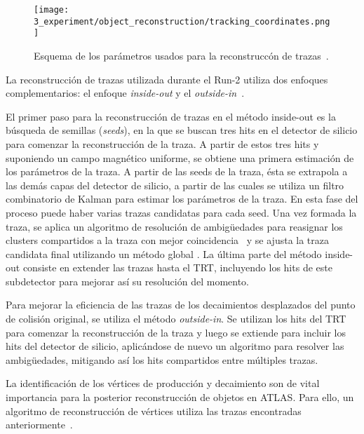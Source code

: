 \begin{figure}[ht!]
    \centering
    \texttt{[image: 3\_experiment/object\_reconstruction/tracking\_coordinates.png]}
    \caption{Esquema de los par\'ametros usados para la reconstrucc\'on de trazas~\cite{ATLAS-Tracking-2007}.}
    \label{fig:objects:track_vtx:track_parameters}
\end{figure}

La reconstrucción de trazas utilizada durante el Run-2 utiliza dos enfoques complementarios: el enfoque \textit{inside-out} y el \textit{outside-in}~\cite{ATLAS-NEWT}.

El primer paso para la reconstrucción de trazas en el m\'etodo inside-out es la búsqueda de semillas (\textit{seeds}), en la que se buscan tres hits en el detector de silicio para comenzar la reconstrucción de la traza. A partir de estos tres hits y suponiendo un campo magnético uniforme, se obtiene una primera estimación de los parámetros de la traza. A partir de las seeds de la traza, ésta se extrapola a las demás capas del detector de silicio, a partir de las cuales se utiliza un filtro combinatorio de Kalman para estimar los parámetros de la traza. En esta fase del proceso puede haber varias trazas candidatas para cada seed. Una vez formada la traza, se aplica un algoritmo de resolución de ambigüedades para reasignar los clusters compartidos a la traza con mejor coincidencia~\cite{ATLAS-NNClustering} y se ajusta la traza candidata final utilizando un método global \chisq. La última parte del método inside-out consiste en extender las trazas hasta el \ac{TRT}, incluyendo los hits de este subdetector para mejorar as\'i su resolución del momento.

Para mejorar la eficiencia de las trazas de los decaimientos desplazados del punto de colisión original, se utiliza el m\'etodo \textit{outside-in}. Se utilizan los hits del \ac{TRT} para comenzar la reconstrucci\'on de la traza y luego se extiende para incluir los hits del detector de silicio, aplicándose de nuevo un algoritmo para resolver las ambigüedades, mitigando as\'i los hits compartidos entre m\'ultiples trazas.

La identificaci\'on de los v\'ertices de producci\'on y decaimiento son de vital importancia para la posterior reconstrucci\'on de objetos en \ac{ATLAS}.
Para ello, un algoritmo de reconstrucci\'on de v\'ertices utiliza las trazas encontradas anteriormente~\cite{ATLAS-PVReconstruction,ATLAS-VertexReconstruction}.

